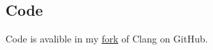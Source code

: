 \documentclass[a0,portrait]{a0poster}
\begin{document}
\begin{multicols}{2}

\section*{Code}

Code is avalible in my \href{https://github.com/omtcyf0/clang}{fork} of Clang on GitHub.


\end{multicols}
\end{document}
